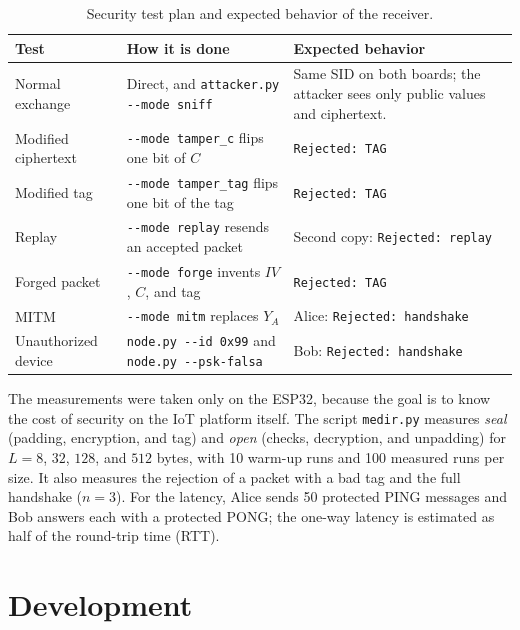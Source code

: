 \documentclass[11pt,a4paper]{article}
\begin{document}
\begin{table}[H]
    \centering
    \caption{Security test plan and expected behavior of the receiver.}
    \label{tab:testplan}
    \small
    \begin{tabularx}{\textwidth}{@{}p{2.9cm}XX@{}}
        \toprule
        \textbf{Test} & \textbf{How it is done} & \textbf{Expected behavior} \\
        \midrule
        Normal exchange & Direct, and \texttt{attacker.py -{}-mode sniff} & Same SID on both boards; the attacker sees only public values and ciphertext. \\
        Modified ciphertext & \texttt{-{}-mode tamper\_c} flips one bit of $C$ & \texttt{Rejected: TAG} \\
        Modified tag & \texttt{-{}-mode tamper\_tag} flips one bit of the tag & \texttt{Rejected: TAG} \\
        Replay & \texttt{-{}-mode replay} resends an accepted packet & Second copy: \texttt{Rejected: replay} \\
        Forged packet & \texttt{-{}-mode forge} invents $\mathit{IV}$, $C$, and tag & \texttt{Rejected: TAG} \\
        MITM & \texttt{-{}-mode mitm} replaces $Y_A$ & Alice: \texttt{Rejected: handshake} \\
        Unauthorized device & \texttt{node.py -{}-id 0x99} and \texttt{node.py -{}-psk-falsa} & Bob: \texttt{Rejected: handshake} \\
        \bottomrule
    \end{tabularx}
\end{table}

The measurements were taken only on the ESP32, because the goal is to know the
cost of security on the IoT platform itself. The script \texttt{medir.py} measures \emph{seal}
(padding, encryption, and tag) and \emph{open} (checks, decryption, and
unpadding) for $L = 8$, $32$, $128$, and $512$ bytes, with 10 warm-up runs and
100 measured runs per size. It also measures the rejection of a packet with a
bad tag and the full handshake ($n = 3$). For the latency, Alice sends 50
protected PING messages and Bob answers each with a protected PONG; the one-way
latency is estimated as half of the round-trip time (RTT).


\section{Development}
\end{document}
